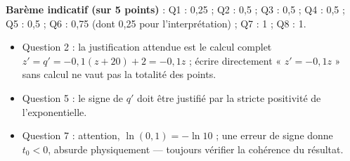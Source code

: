 \documentclass[11pt]{article}
\begin{document}
\begin{corrige}
\textbf{Barème indicatif (sur 5 points)} : Q1 : 0,25 ; Q2 : 0,5 ; Q3 : 0,5 ; Q4 : 0,5 ; Q5 : 0,5 ; Q6 : 0,75 (dont 0,25 pour l'interprétation) ; Q7 : 1 ; Q8 : 1.

\begin{attention}
\begin{itemize}
\item Question 2 : la justification attendue est le calcul complet $z' = q' = -0{,}1(z+20) + 2 = -0{,}1z$ ; écrire directement « $z' = -0{,}1z$ » sans calcul ne vaut pas la totalité des points.
\item Question 5 : le signe de $q'$ doit être justifié par la stricte positivité de l'exponentielle.
\item Question 7 : attention, $\ln(0{,}1) = -\ln 10$ ; une erreur de signe donne $t_0 < 0$, absurde physiquement — toujours vérifier la cohérence du résultat.
\end{itemize}
\end{attention}
\end{corrige}
\end{document}

